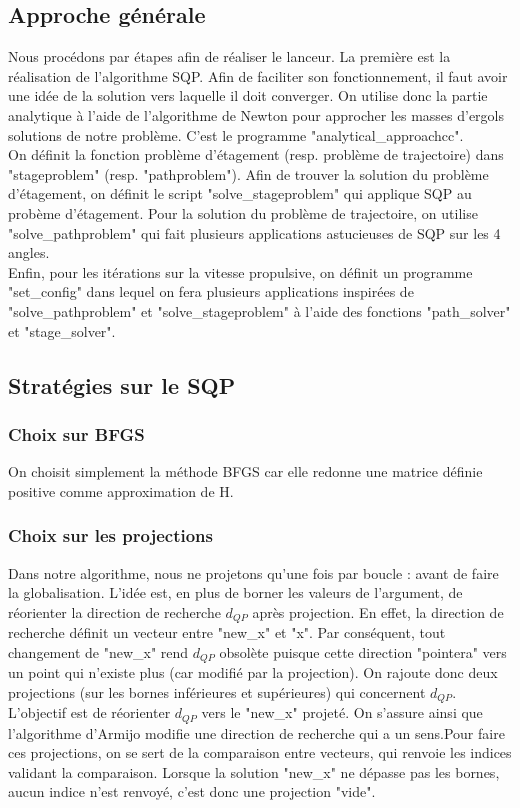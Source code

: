 \subsection{Approche générale}\medbreak

Nous procédons par étapes afin de réaliser le lanceur. La première est la réalisation de l'algorithme SQP. Afin de faciliter son fonctionnement, il faut avoir une idée de la solution vers laquelle il doit converger. On utilise donc la partie analytique à l'aide de l'algorithme de Newton pour approcher les masses d'ergols solutions de notre problème. C'est le programme "analytical\_approachcc".\\
On définit la fonction problème d'étagement (resp. problème de trajectoire) dans "stageproblem" (resp. "pathproblem"). Afin de trouver la solution du problème d'étagement, on définit le script "solve\_stageproblem" qui applique SQP au probème d'étagement. Pour la solution du problème de trajectoire, on utilise "solve\_pathproblem" qui fait plusieurs applications astucieuses de SQP sur les 4 angles.\\
Enfin, pour les itérations sur la vitesse propulsive, on définit un programme "set\_config" dans lequel on fera plusieurs applications inspirées de "solve\_pathproblem" et "solve\_stageproblem" à l'aide des fonctions "path\_solver" et "stage\_solver".\bigbreak

\subsection{Stratégies sur le SQP}\medbreak

\subsubsection{Choix sur BFGS}\medbreak

On choisit simplement la méthode BFGS car elle redonne une matrice définie positive comme approximation de H.\medbreak

\subsubsection{Choix sur les projections}\medbreak

Dans notre algorithme, nous ne projetons qu'une fois par boucle : avant de faire la globalisation. L'idée est, en plus de borner les valeurs de l'argument, de réorienter la direction de recherche $d_{QP}$ après projection. En effet, la direction de recherche définit un vecteur entre "new\_x" et "x". Par conséquent, tout changement de "new\_x" rend $d_{QP}$ obsolète puisque cette direction "pointera" vers un point qui n'existe plus (car modifié par la projection). On rajoute donc deux projections (sur les bornes inférieures et supérieures) qui concernent $d_{QP}$. L'objectif est de réorienter  $d_{QP}$ vers le  "new\_x" projeté. On s'assure ainsi que l'algorithme d'Armijo modifie une direction de recherche qui a un sens.Pour faire ces projections, on se sert de la comparaison entre vecteurs, qui renvoie les indices validant la comparaison. Lorsque la solution "new\_x" ne dépasse pas les bornes, aucun indice n'est renvoyé, c'est donc une projection "vide".\medbreak

